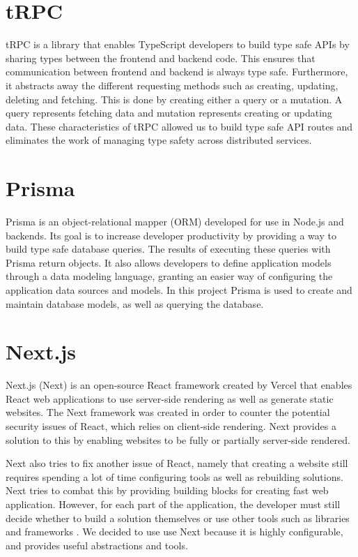 \section{tRPC}
tRPC is a library that enables TypeScript developers to build type safe APIs by sharing types between the frontend and backend code.
This ensures that communication between frontend and backend is always type safe.
Furthermore, it abstracts away the different requesting methods such as creating, updating, deleting and fetching. This is done by creating either a query or a mutation. A query represents fetching data and mutation represents creating or updating data.\cite{tRPC}
These characteristics of tRPC allowed us to build type safe API routes and eliminates the work of managing type safety across distributed services.

\section{Prisma}
Prisma is an object-relational mapper (ORM) developed for use in Node.js and \typescript{} backends.
Its goal is to increase developer productivity by providing a way to build type safe database queries. The results of executing these queries with Prisma return \javascript{} objects\cite{Prisma_Doc}.
It also allows developers to define application models through a data modeling language, granting an easier way of configuring the application data sources and models\cite{Prisma_Why}.
In this project Prisma is used to create and maintain database models, as well as querying the database. 


\section{Next.js}
Next.js (Next) is an open-source React framework created by Vercel that enables React web applications to use server-side rendering as well as generate static websites. The Next framework was created in order to counter the potential security issues of React, which relies on client-side rendering. Next provides a solution to this by enabling websites to be fully or partially server-side rendered\cite {Nextjs_Docks}.

Next also tries to fix another issue of React, namely that creating a website still requires spending a lot of time configuring tools as well as rebuilding solutions.
Next tries to combat this by providing building blocks for creating fast web application.
However, for each part of the application, the developer must still decide whether to build a solution themselves or use other tools such as libraries and frameworks \cite{Nextjs_Docks}.
We decided to use use Next because it is highly configurable, and provides useful abstractions and tools.

